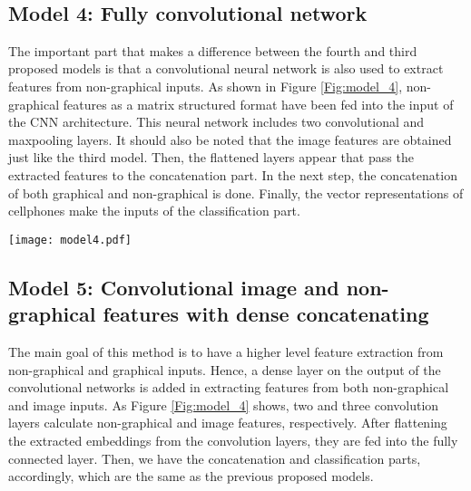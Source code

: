 \documentclass{svjour3}                     \smartqed  \usepackage{graphicx}
\begin{document}
\begin{figure*}
    \hfill
    \hfill
    \hfill
    \\
    \hfill
    \hfill
    \caption{Visualization of different convolutional layers for model 3.}
    \label{Fig:CNN_otput_Model_3}
\end{figure*}

\subsection{Model 4: Fully convolutional network}\label{Subsec:model_4}
The important part that makes a difference between the fourth and third proposed models is that a convolutional neural network is also used to extract features from non-graphical inputs. As shown in Figure \ref{Fig:model_4}, non-graphical features as a matrix structured format have been fed into the input of the CNN architecture. This neural network includes two convolutional and maxpooling layers. It should also be noted that the image features are obtained just like the third model. Then, the flattened layers appear that pass the extracted features to the concatenation part. In the next step, the concatenation of both graphical and non-graphical is done. Finally, the vector representations of cellphones make the inputs of the classification part.

\begin{figure*}
    \centering
    \texttt{[image: model4.pdf]}
    \caption{Neural network architecture of method 4. The only difference between method 4 and 5 is on "FC" layers that appear in method five.}
    \label{Fig:model_4}
\end{figure*}
\subsection{Model 5: Convolutional image and non-graphical features with dense concatenating}\label{Subsec:model_5}
The main goal of this method is to have a higher level feature extraction from non-graphical and graphical inputs. Hence, a dense layer on the output of the convolutional networks is added in extracting features from both non-graphical and image inputs.  As Figure \ref{Fig:model_4} shows, two and three convolution layers calculate non-graphical and image features, respectively. After flattening the extracted embeddings from the convolution layers, they are fed into the fully connected layer. Then, we have the concatenation and classification parts, accordingly, which are the same as the previous proposed models.
\end{document}
